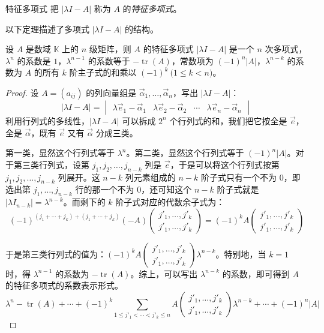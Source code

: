 \begin{definition}{特征多项式}
	把 $|\lambda I - A|$ 称为 $A$ 的\emph{特征多项式}。
\end{definition}

以下定理描述了多项式 $|\lambda I - A|$ 的结构。

\begin{theorem}
	设 $A$ 是数域 $\mathbb K$ 上的 $n$ 级矩阵，则 $A$ 的特征多项式 $|\lambda I - A|$ 是一个 $n$ 次多项式，$\lambda^n$ 的系数是 $1$，$\lambda^{n - 1}$ 的系数等于 $-\operatorname{tr}(A)$，常数项为 $(-1)^n |A|$，$\lambda^{n - k}$ 的系数为 $A$ 的所有 $k$ 阶主子式的和乘以 $(-1)^k \pod{1 \le k < n}$。
\end{theorem}

\begin{proof}
	设 $A = (a_{ij})$ 的列向量组是 $\vec \alpha_1, \ldots, \vec \alpha_n$，写出 $|\lambda I - A|$：
	$$
	|\lambda I - A| =
	\begin{vmatrix} \lambda \vec e_1 - \vec \alpha_1 & \lambda \vec e_2 - \vec \alpha_2 & \cdots & \lambda \vec e_n - \vec \alpha_n \end{vmatrix}
	$$
	利用行列式的多线性，$|\lambda I - A|$ 可以拆成 $2^n$ 个行列式的和，我们把它按全是 $\vec e$，全是 $\vec \alpha$，既有 $\vec e$ 又有 $\vec \alpha$ 分成三类。

	第一类，显然这个行列式等于 $\lambda^n$。第二类，显然这个行列式等于 $(-1)^n |A|$。对于第三类行列式，设第 $j_1, j_2, \ldots, j_{n - k}$ 列是 $\vec e$，于是可以将这个行列式按第 $j_1, j_2, \ldots, j_{n - k}$ 列展开。这 $n - k$ 列元素组成的 $n - k$ 阶子式只有一个不为 $0$，即选出第 $j_1, \ldots, j_{n - k}$ 行的那一个不为 $0$，还可知这个 $n - k$ 阶子式就是 $|\lambda I_{n - k}| = \lambda^{n - k}$。而剩下的 $k$ 阶子式对应的代数余子式为：
	$$
	(-1)^{(j_1 + \cdots + j_k) + (j_1 + \cdots + j_k)} (-A) \begin{pmatrix} j'_1, \ldots, j'_k \\ j'_1, \ldots, j'_k \end{pmatrix} = (-1)^k A \begin{pmatrix} j'_1, \ldots, j'_k \\ j'_1, \ldots, j'_k \end{pmatrix}
	$$

	于是第三类行列式的值为：$(-1)^k A \begin{pmatrix} j'_1, \ldots, j'_k \\ j'_1, \ldots, j'_k \end{pmatrix} \lambda^{n - k}$。特别地，当 $k = 1$ 时，得 $\lambda^{n - 1}$ 的系数为 $-\operatorname{tr}(A)$。综上，可以写出 $\lambda^{n - k}$ 的系数，即可得到 $A$ 的特征多项式的系数表示形式。
	$$
	\lambda^n - \operatorname{tr}(A) + \cdots + (-1)^k \sum_{1 \le j'_1 < \cdots < j'_k \le n} A \begin{pmatrix} j'_1, \ldots, j'_k \\ j'_1, \ldots, j'_k \end{pmatrix} \lambda^{n - k} + \cdots + (-1)^n |A|
	$$
\end{proof}

